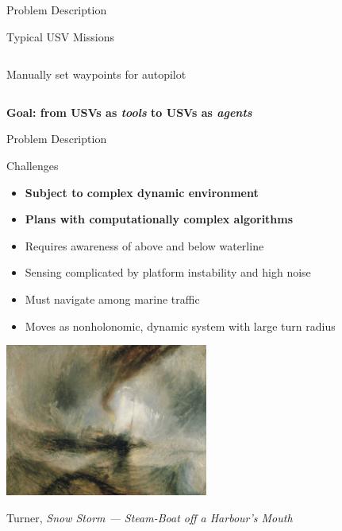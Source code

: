\documentclass[9pt]{beamer}
\begin{document}
\begin{frame}{Problem Description}
\begin{block}{Typical USV Missions}
\begin{columns}
\begin{column}{0.5\textwidth}
\begin{block}{}
\begin{center}
                        \vline
                        \linebreak
                        Manually set waypoints for autopilot
                    \end{center}
                \end{block}
            \end{column}
        \end{columns}
    \end{block}
    \textbf{Goal: from USVs as \textit{tools} to USVs as \textit{agents}}
\end{frame}

\begin{frame}{Problem Description} \label{PD:challenges}
    \begin{block}{Challenges}
	    \begin{itemize}
    	    \item \textbf{Subject to complex dynamic environment}
    	    \item \textbf{Plans with computationally complex algorithms}
	        \item Requires awareness of above and below waterline
	        \item Sensing complicated by platform instability and high noise
    	    \item Must navigate among marine traffic
    	    \item Moves as nonholonomic, dynamic system with large turn radius
    	    \end{itemize}
    \end{block}
    \begin{center}
        \includegraphics[width=0.5\textwidth,trim={5cm 5cm 4cm 4cm},clip]{img/turner_boat.jpg}
        
        \small{Turner, \textit{Snow Storm --- Steam-Boat off a Harbour’s Mouth}}
    \end{center}
\end{frame}

\end{document}
